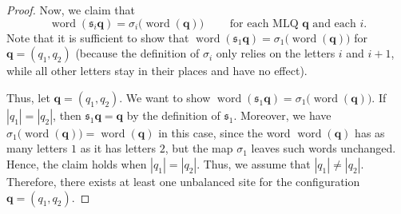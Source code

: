 \documentclass[reqno]{amsart}
\newcommand{\0}{\phantom{c}}
\DeclareMathOperator{\word}{word} %
\newcommand{\qq}{\mathbf{q}}
\newcommand{\fraks}{\mathfrak{s}}
\newcommand{\abs}[1]{\left| #1 \right|}
\theoremstyle{plain}
\theoremstyle{definition}
\numberwithin{equation}{section}
\begin{document}
\begin{proof}
Now, we claim that
\begin{equation}
 \word(\fraks_i \qq) = \sigma_i\bigl( \word(\qq) \bigr)
 \qquad \text{ for each MLQ } \qq \text{ and each } i .
 \label{pf.prop:braid.inter}
\end{equation}
Note that it is sufficient to show that $\word(\fraks_1 \qq) = \sigma_1\bigl( \word(\qq) \bigr)$ for $\qq = (q_1, q_2)$
(because the definition of $\sigma_i$ only relies on the letters $i$ and $i+1$, while all other letters stay in their places and have no effect).

Thus, let $\qq = (q_1, q_2)$.
We want to show $\word(\fraks_1 \qq) = \sigma_1\bigl( \word(\qq) \bigr)$.
If $\abs{q_1} = \abs{q_2}$, then $\fraks_1 \qq = \qq$ by the definition of $\fraks_1$.
Moreover, we have $\sigma_1\bigl( \word(\qq) \bigr) = \word(\qq)$ in this case, since the word $\word(\qq)$ has as many letters $1$ as it has letters $2$, but the map $\sigma_1$ leaves such words unchanged.
Hence, the claim holds when $\abs{q_1} = \abs{q_2}$.
Thus, we assume that $\abs{q_1} \neq \abs{q_2}$.
Therefore, there exists at least one unbalanced site for the configuration $\qq = (q_1, q_2)$.


\end{proof}
\end{document}
